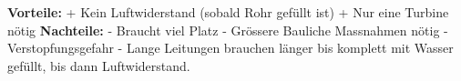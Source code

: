 \textbf{Vorteile:} 									\newline
+	Kein Luftwiderstand (sobald Rohr gefüllt ist)	\newline
+	Nur eine Turbine nötig							\newline
\textbf{Nachteile:}									\newline
-	Braucht viel Platz 								\newline
-	Grössere Bauliche Massnahmen nötig				\newline
-	Verstopfungsgefahr 								\newline
-	Lange Leitungen brauchen länger bis komplett mit Wasser gefüllt, bis dann Luftwiderstand.
